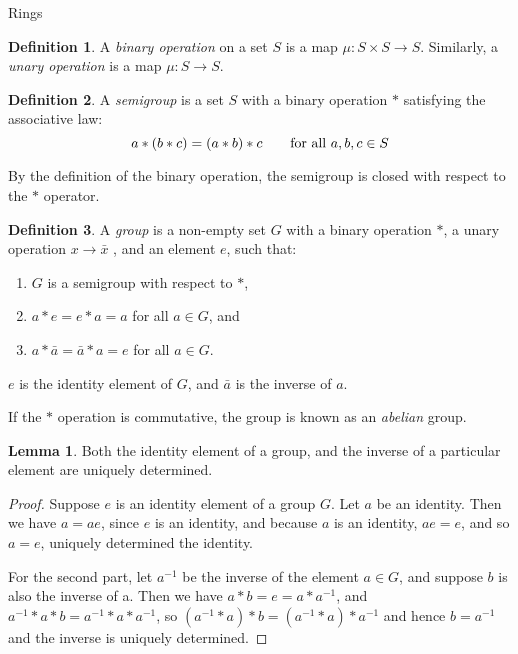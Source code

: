 \documentclass{article}
\theoremstyle{definition}
\newtheorem{definition}{Definition}[section]
\newtheorem{lemma}[theorem]{Lemma}
\begin{document}
\begin{section}{Rings}

  \begin{definition}
    A \emph{binary operation} on a set $S$ is a map $\mu:S \times S \to S$.
    Similarly, a \emph{unary operation} is a map $\mu:S \to S$.
  \end{definition}

  \begin{definition}
    A \emph{semigroup} is a set $S$ with a binary operation $*$ satisfying
    the associative law:
    \[
      a * (b * c) = (a * b) * c \text{\qquad for all } a, b,c \in S
    \]

    By the definition of the binary operation, the semigroup is closed with
    respect to the $*$ operator.

  \end{definition}

  \begin{definition} A \emph{group} is a non-empty set $G$ with a binary
    operation $*$, a unary operation $x \to \bar{x}$ ,
    and an element $e$, such that:

    \begin{enumerate}
      \item $G$ is a semigroup with respect to $*$,
      \item $a * e = e * a = a$ for all $a \in G$, and
      \item $a * \bar{a} = \bar{a} * a = e$ for all $a \in G$.
    \end{enumerate}

    $e$ is the identity element of $G$, and $\bar{a}$ is the inverse of $a$.

    If the $*$ operation is commutative, the group is known as an
    \emph{abelian} group.

  \end{definition}

  \begin{lemma}
    Both the identity element of a group, and the inverse of a particular
    element are uniquely determined.
  \end{lemma}

  \begin{proof}
    Suppose $e$ is an identity element of a group $G$. Let $a$ be an identity.
    Then we have $a = ae$, since $e$ is an identity, and because $a$ is an
    identity, $ae = e$, and so $a = e$, uniquely determined the identity.

    For the second part, let $a^{-1}$ be the inverse of the element $a \in G$,
    and suppose $b$ is also the inverse of a. Then we have $a * b = e = a *
    a^{-1}$, and $ a^{-1} * a * b = a^{-1} * a * a^{-1} $, so $ (a^{-1} * a) *
    b = (a^{-1} * a) * a^{-1} $ and hence $b = a^{-1}$ and the inverse is
    uniquely determined.
  \end{proof}


\end{section}
\end{document}
